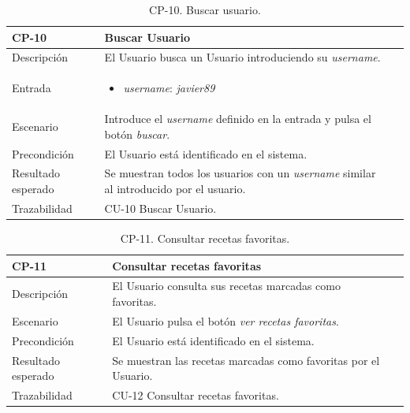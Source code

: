     \begin{table}[H]
        \centering
        \begin{tabularx}{1\textwidth} { 
            | >{\raggedright\arraybackslash}X 
            | >{\raggedright\arraybackslash}X 
            | >{\raggedright\arraybackslash}X 
            |  }
        \hline
        \textbf{CP-10}     & \textbf{Buscar Usuario}                             \\ \hline
        Descripción        & El Usuario busca un Usuario introduciendo su \textit{username}.      \\ \hline
        Entrada            & \begin{itemize}
            \item \textit{username}: \textit{javier89}
        \end{itemize} \\ \hline
        Escenario          & Introduce el \textit{username} definido en la entrada y pulsa el botón \textit{buscar}.                           \\ \hline
        Precondición          & El Usuario está identificado en el sistema.                             \\ \hline
       
        Resultado esperado & Se muestran todos los usuarios con un \textit{username} similar al introducido por el usuario. \\ \hline
        Trazabilidad & CU-10 Buscar Usuario. \\ \hline
    \end{tabularx}
    \caption{CP-10. Buscar usuario.}
    \label{table:CP-10}
        \end{table}


    \begin{table}[H]
        \centering
        \begin{tabularx}{1\textwidth} { 
            | >{\raggedright\arraybackslash}X 
            | >{\raggedright\arraybackslash}X 
            | >{\raggedright\arraybackslash}X
            |  }
        \hline
        \textbf{CP-11}     & \textbf{Consultar recetas favoritas}                             \\ \hline
        Descripción        & El Usuario consulta sus recetas marcadas como favoritas.      \\ \hline
        Escenario          & El Usuario pulsa el botón \textit{ver recetas favoritas}.                           \\ \hline
        Precondición          & El Usuario está identificado en el sistema.                             \\ \hline
        
        Resultado esperado & Se muestran las recetas marcadas como favoritas por el Usuario. \\ \hline
        Trazabilidad & CU-12 Consultar recetas favoritas.\\ \hline
    \end{tabularx}
    \caption{CP-11. Consultar recetas favoritas.}
    \label{table:CP-11}
        \end{table}


